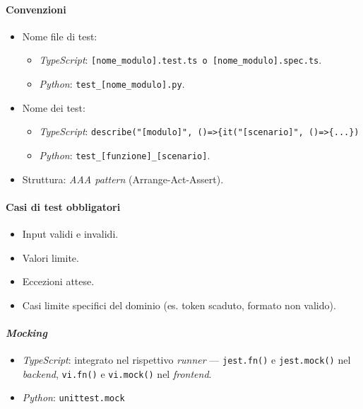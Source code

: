 \documentclass[12pt, a4paper]{article}
\begin{document}
\paragraph{Convenzioni}
\begin{itemize}
    \item Nome file di test:
    \begin{itemize}
        \item \textit{TypeScript}: \texttt{[nome\_modulo].test.ts o [nome\_modulo].spec.ts}.
        \item \textit{Python}: \texttt{test\_[nome\_modulo].py}.
    \end{itemize}
    \item Nome dei test:
    \begin{itemize}
        \item \textit{TypeScript}: \texttt{describe("[modulo]", ()=>\{it("[scenario]", ()=>\{...\})}
        \item \textit{Python}: \texttt{test\_[funzione]\_[scenario]}.
    \end{itemize}
    \item Struttura: \textit{AAA pattern} (Arrange-Act-Assert).
\end{itemize}

\paragraph{Casi di test obbligatori}
\begin{itemize}
    \item Input validi e invalidi.
    \item Valori limite.
    \item Eccezioni attese.
    \item Casi limite specifici del dominio (es. token scaduto, formato non valido).
\end{itemize}

\paragraph{\textit{Mocking}}
\begin{itemize}
    \item \textit{TypeScript}: integrato nel rispettivo \textit{runner} --- \texttt{jest.fn()} e \texttt{jest.mock()} nel \textit{backend}, \texttt{vi.fn()} e \texttt{vi.mock()} nel \textit{frontend}.
    \item \textit{Python}: \texttt{unittest.mock}
\end{itemize}
\end{document}
